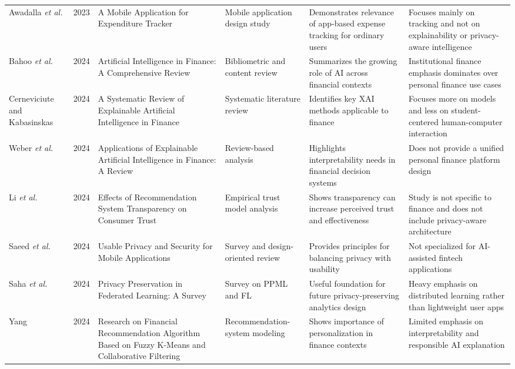 \documentclass[12pt,a4paper]{report}
\begin{document}
\begin{longtable}{p{2.1cm}p{0.9cm}p{2.6cm}p{2.5cm}p{2.6cm}p{2.6cm}}
Awadalla \textit{et al.} &
2023 &
A Mobile Application for Expenditure Tracker &
Mobile application design study &
Demonstrates relevance of app-based expense tracking for ordinary users &
Focuses mainly on tracking and not on explainability or privacy-aware intelligence \\

Bahoo \textit{et al.} &
2024 &
Artificial Intelligence in Finance: A Comprehensive Review &
Bibliometric and content review &
Summarizes the growing role of AI across financial contexts &
Institutional finance emphasis dominates over personal finance use cases \\

Cerneviciute and Kabasinskas &
2024 &
A Systematic Review of Explainable Artificial Intelligence in Finance &
Systematic literature review &
Identifies key XAI methods applicable to finance &
Focuses more on models and less on student-centered human-computer interaction \\

Weber \textit{et al.} &
2024 &
Applications of Explainable Artificial Intelligence in Finance: A Review &
Review-based analysis &
Highlights interpretability needs in financial decision systems &
Does not provide a unified personal finance platform design \\

Li \textit{et al.} &
2024 &
Effects of Recommendation System Transparency on Consumer Trust &
Empirical trust model analysis &
Shows transparency can increase perceived trust and effectiveness &
Study is not specific to finance and does not include privacy-aware architecture \\

Saeed \textit{et al.} &
2024 &
Usable Privacy and Security for Mobile Applications &
Survey and design-oriented review &
Provides principles for balancing privacy with usability &
Not specialized for AI-assisted fintech applications \\

Saha \textit{et al.} &
2024 &
Privacy Preservation in Federated Learning: A Survey &
Survey on PPML and FL &
Useful foundation for future privacy-preserving analytics design &
Heavy emphasis on distributed learning rather than lightweight user apps \\

Yang &
2024 &
Research on Financial Recommendation Algorithm Based on Fuzzy K-Means and Collaborative Filtering &
Recommendation-system modeling &
Shows importance of personalization in finance contexts &
Limited emphasis on interpretability and responsible AI explanation \\
\bottomrule
\end{longtable}
\endgroup
\end{document}
